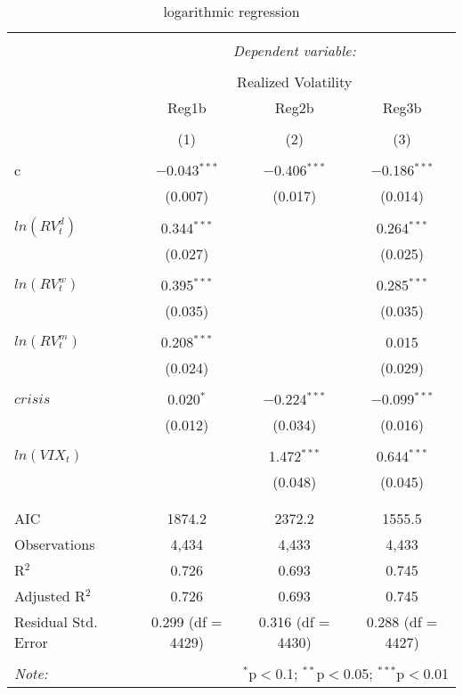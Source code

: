 
\begin{table}[!htbp] \centering 
  \caption{logarithmic regression} 
  \label{} 
\begin{tabular}{@{\extracolsep{5pt}}lccc} 
\\[-1.8ex]\hline 
\hline \\[-1.8ex] 
 & \multicolumn{3}{c}{\textit{Dependent variable:}} \\ 
\cline{2-4} 
\\[-1.8ex] & \multicolumn{3}{c}{Realized Volatility} \\ 
 & Reg1b & Reg2b & Reg3b \\ 
\\[-1.8ex] & (1) & (2) & (3)\\ 
\hline \\[-1.8ex] 
 c & $-$0.043$^{***}$ & $-$0.406$^{***}$ & $-$0.186$^{***}$ \\ 
  & (0.007) & (0.017) & (0.014) \\ 
  & & & \\ 
 $ ln(RV^{d}_{t})$ & 0.344$^{***}$ &  & 0.264$^{***}$ \\ 
  & (0.027) &  & (0.025) \\ 
  & & & \\ 
 $ln(RV^{w}_{t})$ & 0.395$^{***}$ &  & 0.285$^{***}$ \\ 
  & (0.035) &  & (0.035) \\ 
  & & & \\ 
 $ ln(RV^{m}_{t})$ & 0.208$^{***}$ &  & 0.015 \\ 
  & (0.024) &  & (0.029) \\ 
  & & & \\ 
 $crisis$ & 0.020$^{*}$ & $-$0.224$^{***}$ & $-$0.099$^{***}$ \\ 
  & (0.012) & (0.034) & (0.016) \\ 
  & & & \\ 
 $ln(VIX_{t})$ &  & 1.472$^{***}$ & 0.644$^{***}$ \\ 
  &  & (0.048) & (0.045) \\ 
  & & & \\ 
\hline \\[-1.8ex] 
AIC & 1874.2 & 2372.2 & 1555.5 \\ 
Observations & 4,434 & 4,433 & 4,433 \\ 
R$^{2}$ & 0.726 & 0.693 & 0.745 \\ 
Adjusted R$^{2}$ & 0.726 & 0.693 & 0.745 \\ 
Residual Std. Error & 0.299 (df = 4429) & 0.316 (df = 4430) & 0.288 (df = 4427) \\ 
\hline 
\hline \\[-1.8ex] 
\textit{Note:}  & \multicolumn{3}{r}{$^{*}$p$<$0.1; $^{**}$p$<$0.05; $^{***}$p$<$0.01} \\ 
\end{tabular} 
\end{table} 
